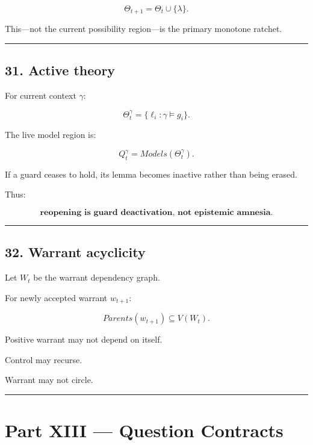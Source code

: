 \documentclass[
]{article}
\begin{document}
\[
\boxed{
\Theta_{t+1}
=
\Theta_t\cup\{\lambda\}.
}
\]

This---not the current possibility region---is the primary monotone
ratchet.

\begin{center}\rule{0.5\linewidth}{0.5pt}\end{center}

\subsection{31. Active theory}\label{active-theory}

For current context \(\gamma\):

\[
\boxed{
\Theta_t^\gamma
=
\{
\ell_i:
\gamma\models g_i
\}.
}
\]

The live model region is:

\[
\boxed{
Q_t^\gamma
=
Models(\Theta_t^\gamma).
}
\]

If a guard ceases to hold, its lemma becomes inactive rather than being
erased.

Thus:

\[
\boxed{
\textbf{reopening is guard deactivation, not epistemic amnesia.}
}
\]

\begin{center}\rule{0.5\linewidth}{0.5pt}\end{center}

\subsection{32. Warrant acyclicity}\label{warrant-acyclicity}

Let \(W_t\) be the warrant dependency graph.

For newly accepted warrant \(w_{t+1}\):

\[
\boxed{
Parents(w_{t+1})
\subseteq
V(W_t).
}
\]

Positive warrant may not depend on itself.

Control may recurse.

Warrant may not circle.

\begin{center}\rule{0.5\linewidth}{0.5pt}\end{center}

\section{Part XIII --- Question
Contracts}\label{part-xiii-question-contracts}
\end{document}
